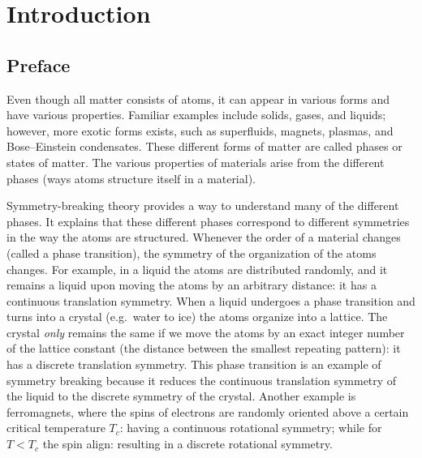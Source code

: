 \chapter{Introduction}
\label{ch:introduction}

\section{Preface}

Even though all matter consists of atoms, it can appear in various forms and have various properties.
Familiar examples include solids, gases, and liquids; however, more exotic forms exists, such as superfluids, magnets, plasmas, and Bose–Einstein condensates.
These different forms of matter are called phases or states of matter.
The various properties of materials arise from the different phases (ways atoms structure itself in a material).

Symmetry-breaking theory provides a way to understand many of the different phases.
It explains that these different phases correspond to different symmetries in the way the atoms are structured.
Whenever the order of a material changes (called a phase transition), the symmetry of the organization of the atoms changes.
For example, in a liquid the atoms are distributed randomly, and it remains a liquid upon moving the atoms by an arbitrary distance: it has a continuous translation symmetry.
When a liquid undergoes a phase transition and turns into a crystal (e.g.~water to ice) the atoms organize into a lattice.
The crystal \textit{only} remains the same if we move the atoms by an exact integer number of the lattice constant (the distance between the smallest repeating pattern): it has a discrete translation symmetry.
This phase transition is an example of symmetry breaking because it reduces the continuous translation symmetry of the liquid to the discrete symmetry of the crystal.
Another example is ferromagnets, where the spins of electrons are randomly oriented above a certain critical temperature $T_c$: having a continuous rotational symmetry; while for $T<T_c$ the spin align: resulting in a discrete rotational symmetry.

